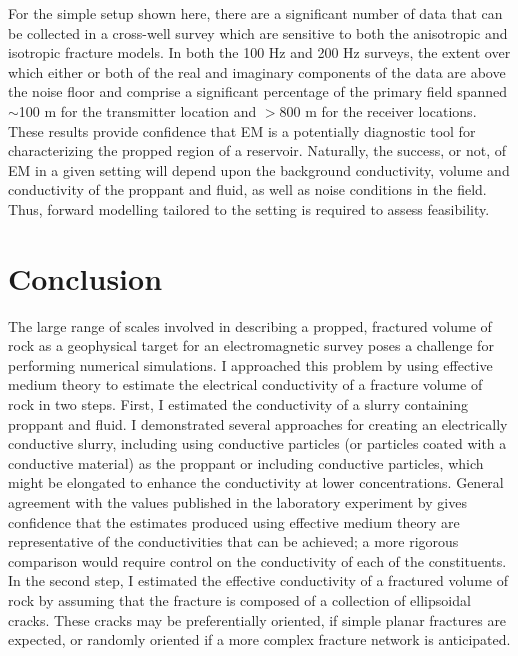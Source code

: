 

For the simple setup shown here, there are a significant number of data that can be collected in a cross-well survey which are sensitive to both the anisotropic and isotropic fracture models. In both the 100 Hz and 200 Hz surveys, the extent over which either or both of the real and imaginary components of the data are above the noise floor and comprise a significant percentage of the primary field spanned $\sim$100 m for the transmitter location and $> 800$ m for the receiver locations. These results provide confidence that EM is a potentially diagnostic tool for characterizing the propped region of a reservoir. Naturally, the success, or not, of EM in a given setting will depend upon the background conductivity, volume and conductivity of the proppant and fluid, as well as noise conditions in the field. Thus, forward modelling tailored to the setting is required to assess feasibility.
\section{Conclusion}

The large range of scales involved in describing a propped, fractured volume of rock as a geophysical target for an electromagnetic survey poses a challenge for performing numerical simulations. I approached this problem by using effective medium theory to estimate the electrical conductivity of a fracture volume of rock in two steps. First, I estimated the conductivity of a slurry containing proppant and fluid. I demonstrated several approaches for creating an electrically conductive slurry, including using conductive particles (or particles coated with a conductive material) as the proppant or including conductive particles, which might be elongated to enhance the conductivity at lower concentrations. General agreement with the values published in the laboratory experiment by \cite{Zhang2016} gives confidence that the estimates produced using effective medium theory are representative of the conductivities that can be achieved; a more rigorous comparison would require control on the conductivity of each of the constituents. In the second step, I estimated the effective conductivity of a fractured volume of rock by assuming that the fracture is composed of a collection of ellipsoidal cracks. These cracks may be preferentially oriented, if simple planar fractures are expected, or randomly oriented if a more complex fracture network is anticipated.

